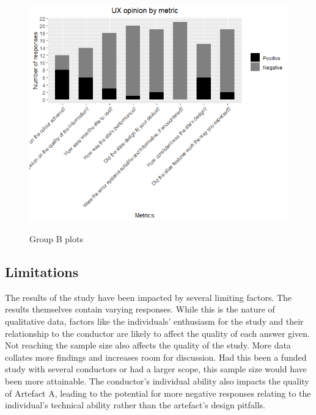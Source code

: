 \documentclass[article]{IEEEtran}
\begin{document}
        \vspace{-10mm}
        
        \begin{figure}[h]
            \caption{Group B plots}
            \includegraphics[width=\columnwidth]{images/data/group-b-plot.png}
            \label{fig:group-b-plots}
        \end{figure}

        \vspace{-7mm}

        \subsection{Limitations}
            The results of the study have been impacted by several limiting factors. The results themselves contain varying responses. While this is the nature of qualitative data, factors like the individuals' enthusiasm for the study and their relationship to the conductor are likely to affect the quality of each answer given. Not reaching the sample size also affects the quality of the study. More data collates more findings and increases room for discussion. Had this been a funded study with several conductors or had a larger scope, this sample size would have been more attainable. The conductor's individual ability also impacts the quality of Artefact A, leading to the potential for more negative responses relating to the individual's technical ability rather than the artefact's design pitfalls.
\end{document}
